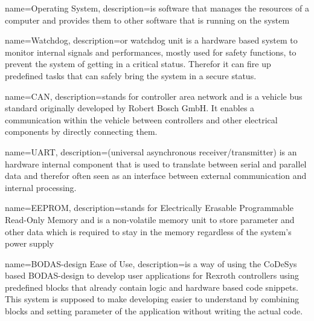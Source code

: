 

{
    name={Operating System},
    description={is software that manages the resources of a computer and provides them to other software that is running on the system}
}



{
    name={Watchdog},
    description={or watchdog unit is a hardware based system to monitor internal signals and performances, mostly used for safety functions, to prevent the system of getting in a critical status. Therefor it can fire up predefined tasks that can safely bring the system in a secure status.}
}

{
    name={CAN},
    description={stands for controller area network and is a vehicle bus standard originally developed by Robert Bosch GmbH. It enables a communication within the vehicle between controllers and other electrical components by directly connecting them.}
}

{
    name={UART},
    description={(universal asynchronous receiver/transmitter) is an hardware internal component that is used to translate between serial and parallel data and therefor often seen as an interface between external communication and internal processing.}
}


{
    name={EEPROM},
    description={stands for Electrically Erasable Programmable Read-Only Memory and is a non-volatile memory unit to store parameter and other data which is required to stay in the memory regardless of the system's power supply}
}


{
    name={BODAS-design Ease of Use},
    description={is a way of using the CoDeSys based BODAS-design to develop user applications for Rexroth controllers using predefined blocks that already contain logic and hardware based code snippets. This system is supposed to make developing easier to understand by combining blocks and setting parameter of the application without writing the actual code.}
}

